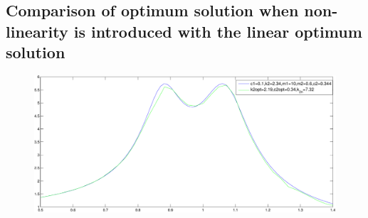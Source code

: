   \subsection{Comparison of optimum solution when non-linearity is introduced with the linear optimum solution}
  \begin{figure}
  \includegraphics[scale=0.6]{"figures/nonlinerassoptimal"}
  \end{figure}
